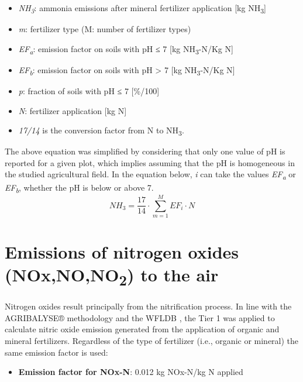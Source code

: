 \documentclass[openany]{book}
\providecommand{\tightlist}{%
  \setlength{\itemsep}{0pt}\setlength{\parskip}{0pt}}
\begin{document}
\begin{itemize}
\item
  \emph{NH\textsubscript{3}}: ammonia emissions after mineral fertilizer application {[}kg NH\textsubscript{3}{]}
\item
  \emph{m}: fertilizer type (M: number of fertilizer types)
\item
  \emph{EF\textsubscript{a}}: emission factor on soils with pH ≤ 7 {[}kg NH\textsubscript{3}-N/Kg N{]}
\item
  \emph{EF\textsubscript{b}}: emission factor on soils with pH \textgreater{} 7 {[}kg NH\textsubscript{3}-N/Kg N{]}
\item
  \emph{p}: fraction of soils with pH ≤ 7 {[}\%/100{]}
\item
  \emph{N}: fertilizer application {[}kg N{]}
\item
  \emph{17/14} is the conversion factor from N to NH\textsubscript{3}.
\end{itemize}

The above equation was simplified by considering that only one value of pH is reported for a given plot, which implies assuming that the pH is homogeneous in the studied agricultural field. In the equation below, \emph{i} can take the values \emph{EF\textsubscript{a}} or \emph{EF\textsubscript{b}}, whether the pH is below or above 7.\\
\[NH_3=\frac{17}{14} \cdot \sum_{m=1}^{M} EF_i \cdot N\]

\hypertarget{emissions-of-nitrogen-oxides-noxnono2-to-the-air}{%
\section{\texorpdfstring{Emissions of nitrogen oxides (NOx,NO,NO\textsubscript{2}) to the air}{Emissions of nitrogen oxides (NOx,NO,NO2) to the air}}\label{emissions-of-nitrogen-oxides-noxnono2-to-the-air}}

Nitrogen oxides result principally from the nitrification process. In line with the AGRIBALYSE® methodology \citep{Koch2015} and the WFLDB \citep{nemecek2014}, the \citet{emep-eea2009} Tier 1 was applied to calculate nitric oxide emission generated from the application of organic and mineral fertilizers. Regardless of the type of fertilizer (i.e., organic or mineral) the same emission factor is used:

\begin{itemize}
\tightlist
\item
  \textbf{Emission factor for NOx-N}: 0.012 kg NOx-N/kg N applied
\end{itemize}
\end{document}
